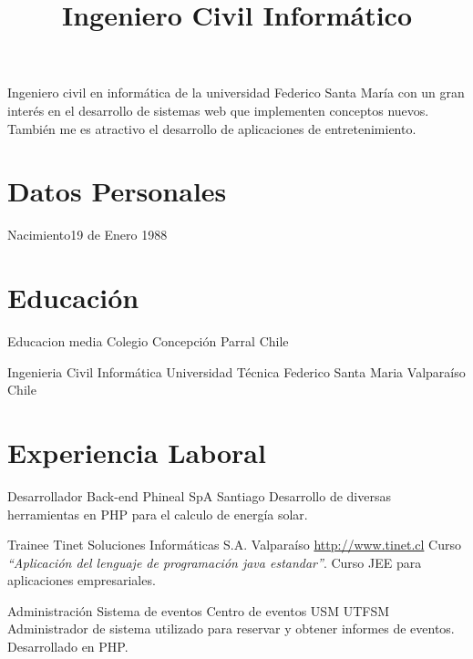 \documentclass[letter,10pt]{moderncv}
\title{Ingeniero Civil Informático}               %
\begin{document}
\maketitle
\vspace{-30pt}
\begin{center}
    Ingeniero civil en informática de la universidad Federico Santa María con un gran interés en el desarrollo de sistemas web que implementen conceptos nuevos. También me es atractivo el desarrollo de aplicaciones de entretenimiento.  

 \end{center}

\section{Datos Personales}

           {Nacimiento}{19 de Enero 1988}
           {}{}

\section{Educación}

        {Educacion media}
        {Colegio Concepción}
        {Parral}
        {Chile}
        {}

        {Ingenieria Civil Informática}
        {Universidad Técnica Federico Santa Maria}
        {Valparaíso}
        {Chile}
        {}

\section{Experiencia Laboral}

        {Desarrollador Back-end}
        {Phineal SpA}
        {Santiago}
        {}
        {Desarrollo de diversas herramientas en PHP para el calculo de energía solar.}

        {Trainee}
        {Tinet Soluciones Informáticas S.A.}
        {Valparaíso}
        {\url{http://www.tinet.cl}}
        {Curso \emph{``Aplicación del lenguaje de programación java estandar''}. Curso JEE para aplicaciones
        empresariales.}

        {Administración Sistema de eventos}
        {Centro de eventos USM}
        {UTFSM}
        {}
        {Administrador de sistema utilizado para reservar y obtener informes de eventos. Desarrollado en PHP.}
\end{document}
